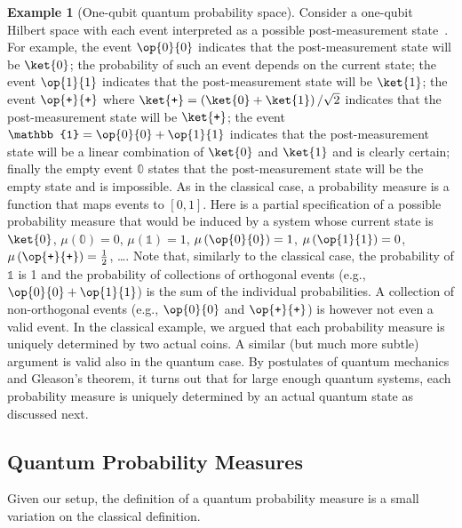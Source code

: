 \documentclass[12pt]{iopart}
\theoremstyle{plain}
\theoremstyle{definition}
\newtheorem{example}[thm]{Example}
\theoremstyle{remark}
\newcommand{\proj}[1]{\op{#1}{#1}}
\newcommand{\ps}{\texttt{+}}
\begin{document}
\begin{example}[One-qubit quantum probability space] Consider a
  one-qubit Hilbert space with each event interpreted as a possible
  post-measurement state~\cite{peres1995quantum,Mermin2007,Jaeger2007}. 
  For example, the event $\proj{0}$ indicates
  that the post-measurement state will be $\ket{0}$; the probability
  of such an event depends on the current state; the event $\proj{1}$
  indicates that the post-measurement state will be $\ket{1}$; the
  event $\proj{\ps}$ where
  $\ket{\ps}=\left(\ket{0}+\ket{1}\right) / \sqrt{2}$ indicates that the
  post-measurement state will be $\ket{\ps}$; the event
  $\mathbb{1}=\proj{0}+\proj{1}$ indicates that the post-measurement
  state will be a linear combination of $\ket{0}$ and $\ket{1}$ and is
  clearly certain; finally the empty event $\mathbb{0}$ states that
  the post-measurement state will be the empty state and is
  impossible. As in the classical case, a probability measure is a
  function that maps events to $[0,1]$. Here is a partial
  specification of a possible probability measure that would be
  induced by a system whose current state is $\ket{0}$,
  $\mu\left(\mathbb{0}\right)=0$, $\mu\left(\mathbb{1}\right)=1$,
  $\mu\left(\proj{0}\right)=1$, $\mu\left(\proj{1}\right)=0$,
  $\mu\left(\proj{\ps}\right)=\frac{1}{2}$, \ldots. Note that, similarly to
  the classical case, the probability of $\mathbb{1}$ is 1 and the
  probability of collections of orthogonal events (e.g.,
  $\proj{0}+\proj{1}$) is the sum of the individual probabilities.  A
  collection of non-orthogonal events (e.g., $\proj{0}$ and
  $\proj{\ps}$) is however not even a valid event. In the classical
  example, we argued that each probability measure is uniquely
  determined by two actual coins. A similar (but much more subtle)
  argument is valid also in the quantum case. By postulates of quantum
  mechanics and Gleason's theorem, it turns out that for large enough
  quantum systems, each probability measure is uniquely determined by
  an actual quantum state as discussed next.
\end{example}

\subsection{Quantum Probability Measures}

Given our setup, the definition of a quantum probability measure is a
small variation on the classical definition. 
\end{document}
